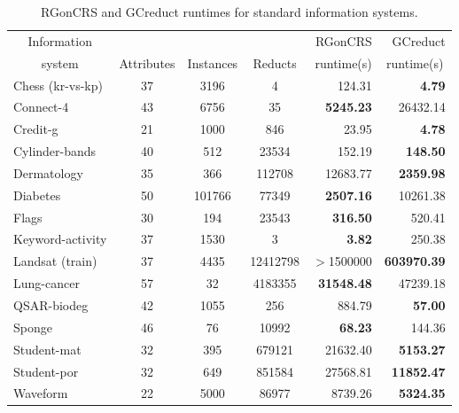 \documentclass[authoryear,preprint,review,12pt]{elsarticle}
\begin{document}
	\begin{table}[!htb]
		\caption{RGonCRS and GCreduct runtimes for standard information systems.}\label{tab:matlab}
		\centering \footnotesize
		\begin{tabular}{|l|c|c|c|r|r|}
			\hline
			\multicolumn{1}{|c|}{Information}&&&& RGonCRS & GCreduct\\ 
			\multicolumn{1}{|c|}{system} & Attributes & Instances & Reducts & runtime(s) & \multicolumn{1}{c|}{runtime(s)}\\ %
			\hline
			Chess (kr-vs-kp)          & 37         & 3196      & 4        & 124.31            & \textbf{4.79}      \\
			Connect-4                 & 43         & 6756      & 35       & \textbf{5245.23}  & 26432.14           \\
			Credit-g                  & 21         & 1000      & 846      & 23.95             & \textbf{4.78}      \\
			Cylinder-bands            & 40         & 512       & 23534    & 152.19            & \textbf{148.50}    \\
			Dermatology               & 35         & 366       & 112708   & 12683.77          & \textbf{2359.98}   \\
			Diabetes                  & 50         & 101766    & 77349    & \textbf{2507.16}  & 10261.38           \\
			Flags                     & 30         & 194       & 23543    & \textbf{316.50}   & 520.41             \\
			Keyword-activity          & 37         & 1530      & 3        & \textbf{3.82}     & 250.38             \\
			Landsat (train)           & 37         & 4435      & 12412798 & $>$1500000        & \textbf{603970.39} \\
			Lung-cancer               & 57         & 32        & 4183355  & \textbf{31548.48} & 47239.18           \\
			QSAR-biodeg               & 42         & 1055      & 256      &  884.79           & \textbf{57.00}     \\
			Sponge                    & 46         & 76        & 10992    & \textbf{68.23}    & 144.36             \\
			Student-mat               & 32         & 395       & 679121   & 21632.40          & \textbf{5153.27}   \\
			Student-por               & 32         & 649       & 851584   & 27568.81          & \textbf{11852.47}  \\
			Waveform                  & 22         & 5000      & 86977    & 8739.26           & \textbf{5324.35}   \\				
			\hline
    	\end{tabular}
    \end{table}
    
\end{document}
